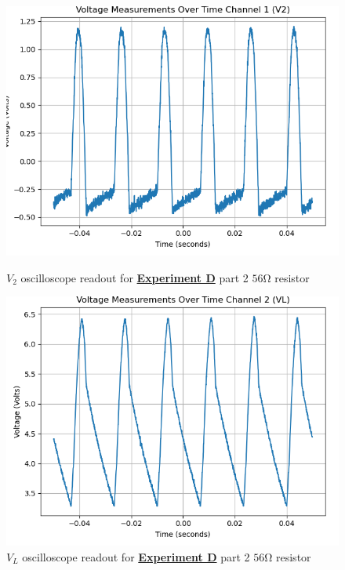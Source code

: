\documentclass[
	letterpaper
	12pt
]{template}
\newcommand{\bref}[2]{\textbf{\hyperref[#1]{#2}}}
\begin{document}
\begin{figure}[H]\label{data::D6}
	\centering
	\begin{minipage}[c]{0.45\textwidth}
		\centering
		\includegraphics[width=\textwidth]{figures/D/7--ch1.png}
	    \caption{$V_{2}$ oscilloscope readout for \bref{exp::D}{Experiment D} part 2 $56\unit{\ohm}$ resistor}
	\end{minipage}
	\hfill
	\begin{minipage}[c]{0.45\textwidth}
		\centering
		\includegraphics[width=\textwidth]{figures/D/7--ch2.png}
	    \caption{$V_{L}$ oscilloscope readout for \bref{exp::D}{Experiment D} part 2 $56\unit{\ohm}$ resistor}
	\end{minipage}
\end{figure}
\end{document}
